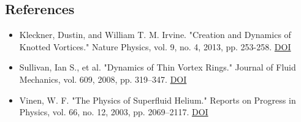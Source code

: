     \subsection*{References}
    \begin{itemize}
        \item Kleckner, Dustin, and William T. M. Irvine. "Creation and Dynamics of Knotted Vortices." Nature Physics, vol. 9, no. 4, 2013, pp. 253-258. \href{https://doi.org/10.1038/NPHYS2560}{DOI}
        \item Sullivan, Ian S., et al. "Dynamics of Thin Vortex Rings." Journal of Fluid Mechanics, vol. 609, 2008, pp. 319–347. \href{https://doi.org/10.1017/S0022112008002292}{DOI}
        \item Vinen, W. F. "The Physics of Superfluid Helium." Reports on Progress in Physics, vol. 66, no. 12, 2003, pp. 2069–2117. \href{https://doi.org/10.1088/0034-4885/66/12/R01}{DOI}
    \end{itemize}

